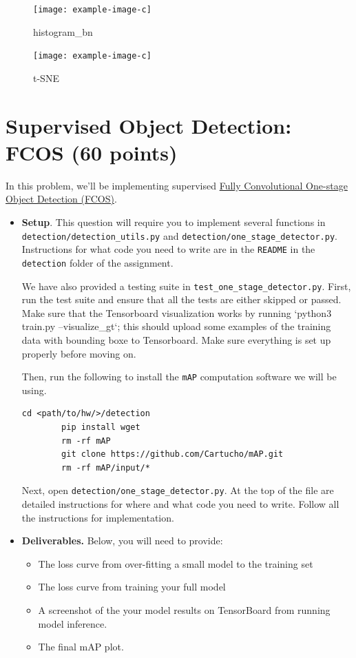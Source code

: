 \documentclass[11pt,addpoints,answers]{exam}
\numberwithin{equation}{section} %
\numberwithin{figure}{section} %
\numberwithin{table}{section} %
\begin{document}
\begin{itemize}
\begin{figure}[H]
\centering
\texttt{[image: example-image-c]}
\caption{histogram\_bn}
\label{fig:q2_bn}
\end{figure}

\begin{figure}[H]
\centering
\texttt{[image: example-image-c]}
\caption{t-SNE}
\label{fig:q2_tsne}
\end{figure}

\end{itemize}

\clearpage
\section{Supervised Object Detection: FCOS (60 points)}
In this problem, we'll be implementing supervised {\href{https://arxiv.org/abs/1904.01355}{Fully Convolutional One-stage Object Detection (FCOS)}}. 

\begin{itemize}
    \item \textbf{Setup}. This question will require you to implement several functions in \texttt{detection/detection\_utils.py} and \texttt{detection/one\_stage\_detector.py}. Instructions for what code you need to write are in the \texttt{README} in the \texttt{detection} folder of the assignment.
    
    We have also provided a testing suite in \texttt{test\_one\_stage\_detector.py}. First, run the test suite
    and ensure that all the tests are either skipped or passed. Make sure that the Tensorboard visualization works by running `python3 train.py --visualize\_gt`; this should upload some examples of the training data with bounding boxe to Tensorboard. Make sure everything is set up properly before moving on.

    Then, run the following to install the \texttt{mAP} computation software we will be using.
    \begin{lstlisting}[language=Shell]
        cd <path/to/hw/>/detection
        pip install wget  
        rm -rf mAP
        git clone https://github.com/Cartucho/mAP.git
        rm -rf mAP/input/*
    \end{lstlisting}

    Next, open \texttt{detection/one\_stage\_detector.py}. At the top of the file are detailed
    instructions for where and what code you need to write. Follow all the instructions for implementation. 

    \item \textbf{Deliverables.} Below, you will need to provide:
    \begin{itemize}
        \item The loss curve from over-fitting a small model to the training set
        \item The loss curve from training your full model
        \item A screenshot of the your model results on TensorBoard from running model inference.
        \item The final mAP plot.
    \end{itemize}
\end{itemize}
\end{document}
